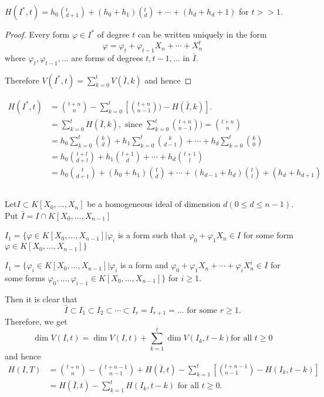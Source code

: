 $H(I^*,t) = h_0 (^t_{d+1}) + (h_0 + h_1) (^t_d) + \cdots + (h_d +h_d
+1)$ for $t >> 1$. 
\begin{proof}
  Every form $\varphi \in I^*$ of degree $t$ can be written uniquely
  in the form  
  $$
  \varphi = \varphi_t + \varphi_{t-1}X_n + \cdots + X^t_n
  $$
  where $\varphi_t , \varphi_{t-1}, \ldots$ are forms of degrees $t,t-1,
  \ldots$ in $\bar{I}$. 
  
  Therefore $V(I^*,t) = \sum \limits^{t}_{k = 0} V(\bar{I},k)$ and hence 
\end{proof}
\begin{align*}
  H(I^*,t) & = \binom{t+n}{n} -\sum^{t}_{k = 0} [
    \binom{t+n}{n-1})-H(\bar{I},k) ]. \\ 
  & = \sum ^{t}_{k = 0}H(\bar{I},k), \text{ since } \sum^{t}_{k =
    0}\binom{t+n}{n-1})= \binom{t+n}{n}\\ 
  & = h_0 \sum^{t}_{k = 0} \binom k d + h_1 \sum^{t}_{k = 0} \binom{k}{d-1} +
  \cdots + h_d \sum^{t}_{k = 0} \binom k 0\\ 
  & = h_0 \binom{t+l}{d+l}+ h_1 \binom{t+1}{d} + \cdots + h_d \binom{t+1}{l}\\
  & = h_0 \binom{t}{d+1}+ (h_0+ h_1) \binom t d + \cdots + (h_{d-1}+
  h_d)\binom t l+ (h_{d}+ h_{d+1}) 
\end{align*}

\subsection{}\label{chap1:sec3:subsec1.42} 
Let\pageoriginale $I \subset K[ X_0, \ldots, X_{n}]$ be a homogeneous ideal of
dimension $d(0 \leq d \leq n-1)$. Put $\bar{I} =I \cap K[ X_0, \ldots,
  X_{n-1}] $ 

$I_1 = \{ \varphi \in K[ X_0, \ldots, X_{n-1}]| \varphi_i$
 is a form such that $\varphi_0 + \varphi_1 X_n \in I$
 for some form  $\varphi \in K[ X_0, \ldots, X_{n-1}] \}$

$I_1 = \{ \varphi_i \in K[ X_0, \ldots, X_{n-1}]| \varphi_i$ 
is a form and $\varphi_0 + \varphi_1 X_n + \cdots + \varphi_i X^i_n
\in I $ for some forms $\varphi_0,  \ldots, \varphi_{i-1}  \in
K[ X_0, \ldots, X_{n-1}] \}$ for $i \geq 1$.  

Then it is clear that 
$$
\bar{I} \subset I_1 \subset I_2 \subset \cdots \subset I_r = I_{r+1} =
\ldots \text{ for some } r \geq 1. 
$$
Therefore, we get 
$$
\dim V (I,t) = \dim V (I,t) + \sum^t_{k=1} \dim V (I_k, t-k) \text{
  for all } t \geq 0 
$$
and hence 
\begin{align*}
  H(I,T) &= \binom{t+n}{n}- \binom{t+n-1}{n-1} + H(\bar{I}, t) -\sum^t_{k=1}
  [(^{t+n-1}_{n-1}) -H (I_k, t-k)] \\ 
  &= H(\bar{I}, t) -\sum^t_{k=1}H (I_k, t-k) \text{ for all } t \geq 0.
\end{align*}\pageoriginale

